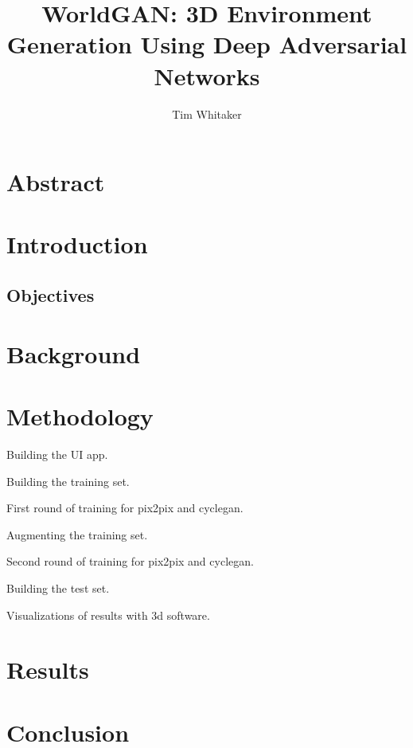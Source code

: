 \documentclass[twocolumn]{article}
\title{WorldGAN: 3D Environment Generation Using Deep Adversarial Networks}
\author{Tim Whitaker}
\begin{document}
	\maketitle
	
	\section{Abstract}
	
	\section{Introduction}
	
	\subsection{Objectives}
	
	\section{Background}
	
	\section{Methodology}
	
	Building the UI app.
	
	Building the training set.
	
	First round of training for pix2pix and cyclegan.
	
	Augmenting the training set.
	
	Second round of training for pix2pix and cyclegan.
	
	Building the test set.
	
	Visualizations of results with 3d software.

	\section{Results}

	\section{Conclusion}
	
\end{document}
